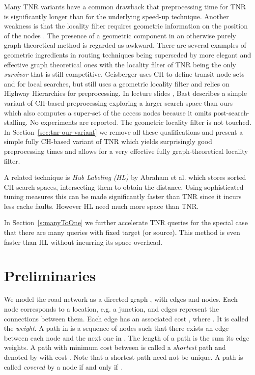 \documentclass{llncs}
\newcommand{\etal}{et al.\xspace}
\begin{document}
Many TNR variants have a common drawback that preprocessing time for TNR is significantly longer than for the underlying speed-up technique. 
Another weakness is that the locality filter requires geometric information on the position of the nodes \cite{bfm-trans-06,bfmss-itcsp-07,g-ch-08}. 
The presence of a geometric component in an otherwise purely graph theoretical method is regarded as awkward. 
There are several examples of geometric ingredients in routing techniques being superseded by more elegant and effective graph theoretical ones \cite{s-rprn-08,dssw-erpa-09} with the locality filter of TNR being the only \textit{survivor} that is still competitive.
Geisberger \cite{g-ch-08} uses CH to define transit node sets and for local searches, but still uses a geometric locality filter and relies on Highway Hierarchies \cite{ss-ehh-12} for preprocessing. 
In lecture slides \cite{Bast11}, Bast
describes a simple variant of CH-based preprocessing exploring a larger search space than ours which also computes a super-set of the access nodes because it omits post-search-stalling. No experiments are reported. The geometric locality filter is not touched. In Section~\ref{sec:tnr-our-variant} we remove all these qualifications and present a simple fully CH-based variant of TNR which yields surprisingly good preprocessing times and allows for a very effective fully graph-theoretical locality filter.


A related technique is \textit{Hub Labeling (HL)} by Abraham \etal \cite{adgw-ahbla-11} which stores sorted CH search spaces, intersecting them to obtain the distance. 
Using sophisticated tuning measures this can be made significantly faster than TNR since it incurs less cache faults. However HL need much more space than TNR. 



In Section~\ref{s:manyToOne} we further accelerate TNR queries for the special case that there are many queries with fixed target (or source). This method is even faster than HL without incurring its space overhead.

\section{Preliminaries}\label{sec:tnr-preliminaries}
We model the road network as a directed graph , with  edges and  nodes.
Each node corresponds to a location, e.g. a junction, and edges represent the connections between them.
Each edge  has an associated cost , where .
It is called the \textit{weight}.
A path  in  is a sequence of nodes such that there exists an edge between each node and the next one in .
The length of a path  is the sum its edge weights.
A path with minimum cost between  is called a \textit{shortest} path and denoted by  with cost . 
Note that a shortest path need not be unique.
A path  is called \textit{covered} by a node  if and only if . 
\end{document}
